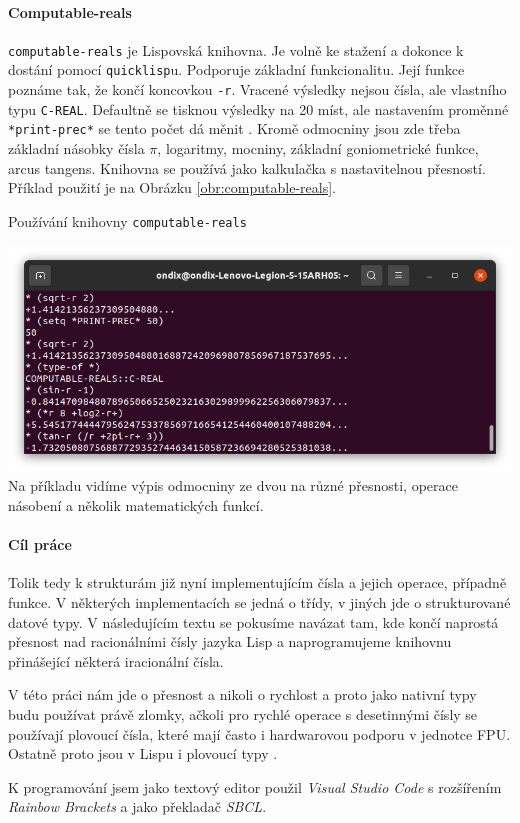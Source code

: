\paragraph{Computable-reals \cite{gh:cr}}\label{kap:computable-reals}
\texttt{computable-reals} je Lispovská knihovna. Je volně ke stažení a dokonce k dostání pomocí \texttt{quicklisp}u. Podporuje základní funkcionalitu. Její funkce poznáme tak, že končí koncovkou \texttt{-r}. Vracené výsledky nejsou čísla, ale vlastního typu \texttt{C-REAL}. Defaultně se tisknou výsledky na 20 míst, ale nastavením proměnné \texttt{*print-prec*} se tento počet dá měnit \cite{lpb:numbers}. Kromě odmocniny jsou zde třeba základní násobky čísla $\pi$, logaritmy, mocniny, základní goniometrické funkce, arcus tangens. Knihovna se používá jako kalkulačka s nastavitelnou přesností. Příklad použití je na Obrázku \ref{obr:computable-reals}.

\begin{myfigure}{}
\caption{Používání knihovny \texttt{computable-reals}}
\includegraphics[width=\linewidth]{./graphics/computable-reals.png}\label{obr:computable-reals}
Na příkladu vidíme výpis odmocniny ze dvou na různé přesnosti, operace násobení a  několik matematických funkcí.
\end{myfigure}\FloatBarrier

\paragraph{Cíl práce}
Tolik tedy k strukturám již nyní implementujícím čísla a jejich operace, případně funkce. V některých implementacích se jedná o třídy, v jiných jde o strukturované datové typy. V následujícím textu se pokusíme navázat tam, kde končí naprostá přesnost nad racionálními čísly jazyka Lisp a naprogramujeme knihovnu přinášející některá iracionální čísla.

V této práci nám jde o přesnost a nikoli o rychlost a proto jako nativní typy budu používat právě zlomky, ačkoli pro rychlé operace s desetinnými čísly se používají plovoucí čísla, které mají často i hardwarovou podporu v jednotce FPU. Ostatně proto jsou v Lispu i plovoucí typy \cite{PS:PCL}.

K programování jsem jako textový editor použil \textit{Visual Studio Code} s rozšířením \textit{Rainbow Brackets} a jako překladač \textit{SBCL}.
